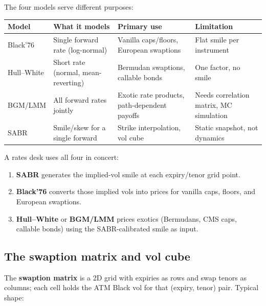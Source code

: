 The four models serve different purposes:

\begin{center}
\begin{tabular}{p{}p{}p{}p{}}
  \toprule
  \textbf{Model} & \textbf{What it models} & \textbf{Primary use} & \textbf{Limitation} \\
  \midrule
  Black'76 &
    Single forward rate (log-normal) &
    Vanilla caps/floors, European swaptions &
    Flat smile per instrument \\[3pt]
  Hull--White &
    Short rate (normal, mean-reverting) &
    Bermudan swaptions, callable bonds &
    One factor, no smile \\[3pt]
  BGM/LMM &
    All forward rates jointly &
    Exotic rate products, path-dependent payoffs &
    Needs correlation matrix, MC simulation \\[3pt]
  SABR &
    Smile/skew for a single forward &
    Strike interpolation, vol cube &
    Static snapshot, not dynamics \\
  \bottomrule
\end{tabular}
\end{center}

A rates desk uses all four in concert:
\begin{enumerate}
  \item \textbf{SABR} generates the implied-vol smile at each
    expiry/tenor grid point.
  \item \textbf{Black'76} converts those implied vols into prices for
    vanilla caps, floors, and European swaptions.
  \item \textbf{Hull--White} or \textbf{BGM/LMM} prices exotics
    (Bermudans, CMS caps, callable bonds) using the SABR-calibrated
    smile as input.
\end{enumerate}

\subsection{The swaption matrix and vol cube}

The \textbf{swaption matrix} is a 2D grid with expiries as rows and
swap tenors as columns; each cell holds the ATM Black vol for that
(expiry, tenor) pair.  Typical shape:

